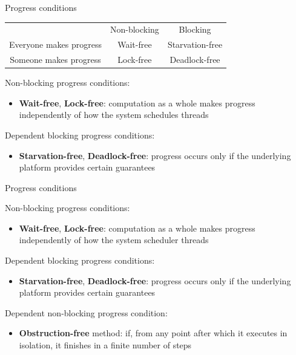 \begin{frame}[t,noframenumbering]{Progress conditions}

\begin{center}
\begin{tabular}{ccc}
                        & Non-blocking & Blocking \\
Everyone makes progress & Wait-free & Starvation-free \\
Someone makes progress  & Lock-free & Deadlock-free 
\end{tabular}
\end{center}

\pause

Non-blocking progress conditions:
\begin{itemize}
  \item \textbf{Wait-free}, \textbf{Lock-free}: computation as a whole makes progress independently of how the system schedules threads
\end{itemize}

\pause

Dependent blocking progress conditions:
\begin{itemize}
  \item \textbf{Starvation-free}, \textbf{Deadlock-free}: progress occurs only if the underlying platform provides certain guarantees
\end{itemize}
\end{frame}

\begin{frame}[t,noframenumbering]{Progress conditions}

Non-blocking progress conditions:
\begin{itemize}
  \item \textbf{Wait-free}, \textbf{Lock-free}: computation as a whole makes progress independently of how the system scheduler threads
\end{itemize}

Dependent blocking progress conditions:
\begin{itemize}
  \item \textbf{Starvation-free}, \textbf{Deadlock-free}: progress occurs only if the underlying platform provides certain guarantees
\end{itemize}


\pause
Dependent non-blocking progress condition:
\begin{itemize}
  \item \textbf{Obstruction-free} method: if, from any point after which it executes in isolation, it finishes in a finite number of steps
\end{itemize}

\end{frame}


